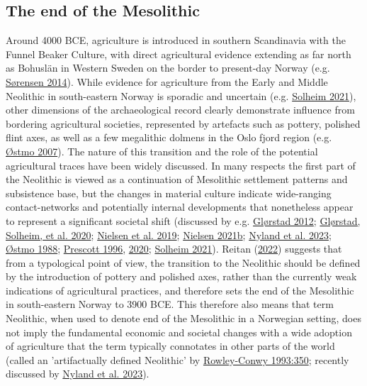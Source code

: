 \documentclass[
  12pt,
  a4paper,
  oneside]{book}
\begin{document}
\hypertarget{the-end-of-the-mesolithic}{%
\subsection{The end of the Mesolithic}\label{the-end-of-the-mesolithic}}

Around 4000 BCE, agriculture is introduced in southern Scandinavia with the Funnel Beaker Culture, with direct agricultural evidence extending as far north as Bohuslän in Western Sweden on the border to present-day Norway (e.g. \protect\hyperlink{ref-sorensen2014a}{Sørensen 2014}). While evidence for agriculture from the Early and Middle Neolithic in south-eastern Norway is sporadic and uncertain (e.g. \protect\hyperlink{ref-solheim2021}{Solheim 2021}), other dimensions of the archaeological record clearly demonstrate influence from bordering agricultural societies, represented by artefacts such as pottery, polished flint axes, as well as a few megalithic dolmens in the Oslo fjord region (e.g. \protect\hyperlink{ref-uxf8stmo2007}{Østmo 2007}). The nature of this transition and the role of the potential agricultural traces have been widely discussed. In many respects the first part of the Neolithic is viewed as a continuation of Mesolithic settlement patterns and subsistence base, but the changes in material culture indicate wide-ranging contact-networks and potentially internal developments that nonetheless appear to represent a significant societal shift (discussed by e.g. \protect\hyperlink{ref-glorstad2012}{Glørstad 2012}; \protect\hyperlink{ref-glorstad2020b}{Glørstad, Solheim, et al. 2020}; \protect\hyperlink{ref-nielsen2019}{Nielsen et al. 2019}; \protect\hyperlink{ref-nielsen2022}{Nielsen 2021b}; \protect\hyperlink{ref-nyland2023}{Nyland et al. 2023}; \protect\hyperlink{ref-ostmo1988}{Østmo 1988}; \protect\hyperlink{ref-prescott1996}{Prescott 1996}, \protect\hyperlink{ref-prescott2020}{2020}; \protect\hyperlink{ref-solheim2021}{Solheim 2021}). Reitan (\protect\hyperlink{ref-reitan2022}{2022}) suggests that from a typological point of view, the transition to the Neolithic should be defined by the introduction of pottery and polished axes, rather than the currently weak indications of agricultural practices, and therefore sets the end of the Mesolithic in south-eastern Norway to 3900 BCE. This therefore also means that term Neolithic, when used to denote end of the Mesolithic in a Norwegian setting, does not imply the fundamental economic and societal changes with a wide adoption of agriculture that the term typically connotates in other parts of the world (called an 'artifactually defined Neolithic' by \protect\hyperlink{ref-rowley-conwy1993}{Rowley-Conwy 1993:350}; recently discussed by \protect\hyperlink{ref-nyland2023}{Nyland et al. 2023}).
\end{document}
